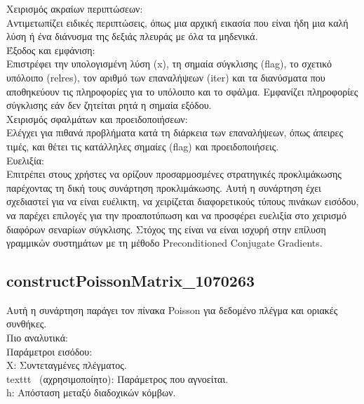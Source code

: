 \documentclass[12pt,a4paper]{article}
\begin{document}
Χειρισμός ακραίων περιπτώσεων:\\
Αντιμετωπίζει ειδικές περιπτώσεις, όπως μια αρχική εικασία που είναι ήδη μια καλή λύση ή ένα διάνυσμα της δεξιάς πλευράς με όλα τα μηδενικά.\\

Έξοδος και εμφάνιση:\\
Επιστρέφει την υπολογισμένη λύση (x), τη σημαία σύγκλισης (flag), το σχετικό υπόλοιπο (relres), τον αριθμό των επαναλήψεων (iter) και τα διανύσματα που αποθηκεύουν τις πληροφορίες για το υπόλοιπο και το σφάλμα.
Εμφανίζει πληροφορίες σύγκλισης εάν δεν ζητείται ρητά η σημαία εξόδου.\\

Χειρισμός σφαλμάτων και προειδοποιήσεων:\\
Ελέγχει για πιθανά προβλήματα κατά τη διάρκεια των επαναλήψεων, όπως άπειρες τιμές, και θέτει τις κατάλληλες σημαίες (flag) και προειδοποιήσεις.\\

Ευελιξία:\\
Επιτρέπει στους χρήστες να ορίζουν προσαρμοσμένες στρατηγικές προκλιμάκωσης παρέχοντας τη δική τους συνάρτηση προκλιμάκωσης.
Αυτή η συνάρτηση έχει σχεδιαστεί για να είναι ευέλικτη, να χειρίζεται διαφορετικούς τύπους πινάκων εισόδου, να παρέχει επιλογές για την προαποτύπωση και να προσφέρει ευελιξία στο χειρισμό διαφόρων σεναρίων σύγκλισης. Στόχος της είναι να είναι ισχυρή στην επίλυση γραμμικών συστημάτων με τη μέθοδο Preconditioned Conjugate Gradients.

\subsection{constructPoissonMatrix\_1070263}
Αυτή η συνάρτηση παράγει τον πίνακα Poisson για δεδομένο πλέγμα και οριακές συνθήκες. \\

Πιο αναλυτικά:\\
Παράμετροι εισόδου:\\
X: Συντεταγμένες πλέγματος.\\
texttt{~} (αχρησιμοποίητο): Παράμετρος που αγνοείται.\\
h: Απόσταση μεταξύ διαδοχικών κόμβων.\\
\end{document}
